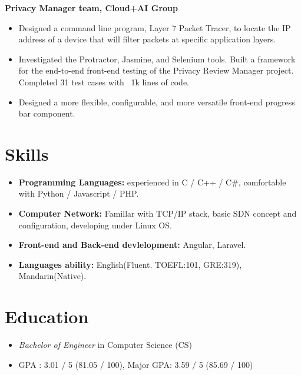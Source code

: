 \documentclass{resume}
\begin{document}
\textbf{Privacy Manager team, Cloud+AI Group}
\begin{itemize}
  \item Designed a command line program, Layer 7 Packet Tracer, to locate the IP address of a device that will filter packets at specific application layers.
  \item Investigated the Protractor, Jasmine, and Selenium tools. Built a framework for the end-to-end front-end testing of the Privacy Review Manager project. Completed 31 test cases with ~1k lines of code.
  \item Designed a more flexible, configurable, and more versatile front-end progress bar component.
\end{itemize}

\section{Skills}
\begin{itemize}[parsep=0.5ex]
  \item \textbf{Programming Languages:} experienced in C / C++ / C\#, comfortable with Python / Javascript / PHP.
  \item \textbf{Computer Network:} Famillar with TCP/IP stack, basic SDN concept and configuration, developing under Linux OS.
  \item \textbf{Front-end and Back-end devlelopment:} Angular, Laravel.
  \item \textbf{Languages ability:} English(Fluent. TOEFL:101, GRE:319), Mandarin(Native).
\end{itemize}

\section{Education}
\begin{itemize}
  \item \textit{Bachelor of Engineer} in Computer Science (CS)
  \item GPA : 3.01 / 5 (81.05 / 100), Major GPA: 3.59 / 5 (85.69 / 100)
\end{itemize}

%
%
\end{document}
